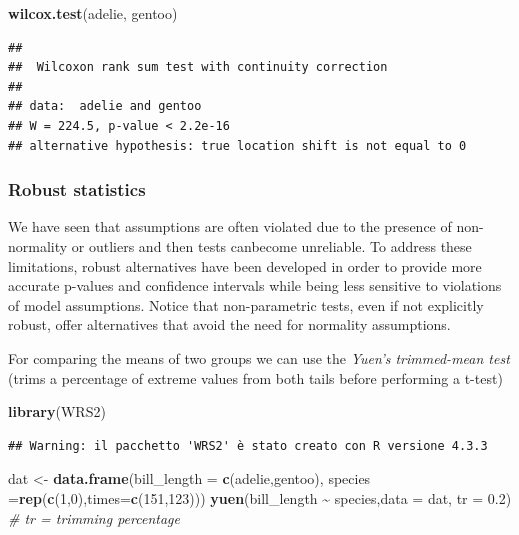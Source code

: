 \documentclass[
]{article}
\newenvironment{Shaded}{\begin{snugshade}}{\end{snugshade}}
\newcommand{\AttributeTok}[1]{\textcolor[rgb]{0.13,0.29,0.53}{#1}}
\newcommand{\CommentTok}[1]{\textcolor[rgb]{0.56,0.35,0.01}{\textit{#1}}}
\newcommand{\DecValTok}[1]{\textcolor[rgb]{0.00,0.00,0.81}{#1}}
\newcommand{\FloatTok}[1]{\textcolor[rgb]{0.00,0.00,0.81}{#1}}
\newcommand{\FunctionTok}[1]{\textcolor[rgb]{0.13,0.29,0.53}{\textbf{#1}}}
\newcommand{\NormalTok}[1]{#1}
\newcommand{\OtherTok}[1]{\textcolor[rgb]{0.56,0.35,0.01}{#1}}
\newcommand{\SpecialCharTok}[1]{\textcolor[rgb]{0.81,0.36,0.00}{\textbf{#1}}}
\begin{document}
\begin{Shaded}
\begin{Highlighting}[]
\FunctionTok{wilcox.test}\NormalTok{(adelie, gentoo)}
\end{Highlighting}
\end{Shaded}

\begin{verbatim}
## 
##  Wilcoxon rank sum test with continuity correction
## 
## data:  adelie and gentoo
## W = 224.5, p-value < 2.2e-16
## alternative hypothesis: true location shift is not equal to 0
\end{verbatim}

\hypertarget{robust-statistics}{%
\subsubsection{Robust statistics}\label{robust-statistics}}

We have seen that assumptions are often violated due to the presence of
non-normality or outliers and then tests canbecome unreliable. To
address these limitations, robust alternatives have been developed in
order to provide more accurate p-values and confidence intervals while
being less sensitive to violations of model assumptions. Notice that
non-parametric tests, even if not explicitly robust, offer alternatives
that avoid the need for normality assumptions.

For comparing the means of two groups we can use the \emph{Yuen's
trimmed-mean test} (trims a percentage of extreme values from both tails
before performing a t-test)

\begin{Shaded}
\begin{Highlighting}[]
\FunctionTok{library}\NormalTok{(WRS2)}
\end{Highlighting}
\end{Shaded}

\begin{verbatim}
## Warning: il pacchetto 'WRS2' è stato creato con R versione 4.3.3
\end{verbatim}

\begin{Shaded}
\begin{Highlighting}[]
\NormalTok{dat }\OtherTok{\textless{}{-}} \FunctionTok{data.frame}\NormalTok{(}\AttributeTok{bill\_length =} \FunctionTok{c}\NormalTok{(adelie,gentoo), }\AttributeTok{species =}\FunctionTok{rep}\NormalTok{(}\FunctionTok{c}\NormalTok{(}\DecValTok{1}\NormalTok{,}\DecValTok{0}\NormalTok{),}\AttributeTok{times=}\FunctionTok{c}\NormalTok{(}\DecValTok{151}\NormalTok{,}\DecValTok{123}\NormalTok{)))}
\FunctionTok{yuen}\NormalTok{(bill\_length }\SpecialCharTok{\textasciitilde{}}\NormalTok{ species,}\AttributeTok{data =}\NormalTok{  dat, }\AttributeTok{tr =} \FloatTok{0.2}\NormalTok{) }\CommentTok{\# tr = trimming percentage}
\end{Highlighting}
\end{Shaded}
\end{document}
